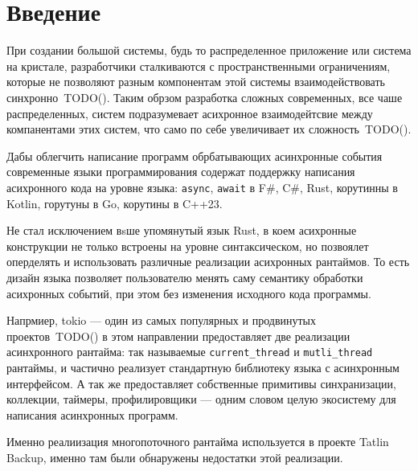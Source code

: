 
\section*{Введение}
\thispagestyle{withCompileDate}


При создании большой системы, будь то распределенное приложение или система на кристале, разработчики сталкиваются с пространственными ограничениям, которые не позволяют разным компонентам этой системы взаимодействовать синхронно~TODO(). Таким обрзом разработка сложных современных, все чаше распределенных, систем подразумевает асихронное взаимодейтсвие между компанентами этих систем, что само по себе увеличивает их сложность~TODO().

Дабы облегчить написание программ обрбатывающих асинхронные события современные языки программирования содержат поддержку написания асихронного кода на уровне языка: \verb|async|, \verb|await| в F\#, C\#, Rust, корутинны в Kotlin, горутуны в Go, корутины в C++23.

Не стал исключением вsше упомянутый язык Rust, в коем асихронные конструкции не только встроены на уровне синтаксическом, но позвоялет оперделять и использовать различные реализации асихронных рантаймов. То есть дизайн языка позволяет пользователю менять саму семантику обработки асихронных событий, при этом без изменения исходного кода программы.

Напрмиер, tokio --- один из самых популярных и продвинутых проектов~TODO() в этом направлении предоставляет две реализации асинхронного рантайма: так называемые \verb|current_thread| и \verb|mutli_thread| рантаймы, и частично реализует стандартную библиотеку языка с асинхронным интерфейсом. А так же предоставляет собственные примитивы синхранизации, коллекции, таймеры, профилировщики --- одним словом целую экосистему для написания асинхронных программ.

Именно реалиизация многопоточного рантайма используется в проекте Tatlin Backup, именно там были обнаружены недостатки этой реализации.
